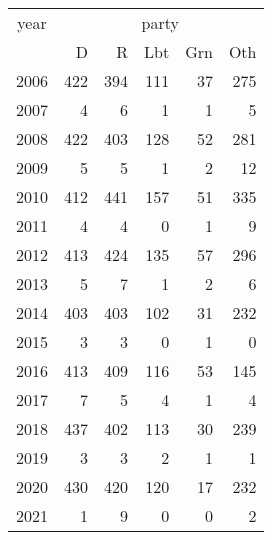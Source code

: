 \footnotesize\begin{tabular}[t]{lrrrrr}
\toprule
\multicolumn{1}{c}{year} & \multicolumn{5}{c}{party} \\
\cmidrule(l{3pt}r{3pt}){1-1} \cmidrule(l{3pt}r{3pt}){2-6}
  & D & R & Lbt & Grn & Oth\\
\midrule
2006 & 422 & 394 & 111 & 37 & 275\\
2007 & 4 & 6 & 1 & 1 & 5\\
2008 & 422 & 403 & 128 & 52 & 281\\
2009 & 5 & 5 & 1 & 2 & 12\\
2010 & 412 & 441 & 157 & 51 & 335\\
2011 & 4 & 4 & 0 & 1 & 9\\
2012 & 413 & 424 & 135 & 57 & 296\\
2013 & 5 & 7 & 1 & 2 & 6\\
2014 & 403 & 403 & 102 & 31 & 232\\
2015 & 3 & 3 & 0 & 1 & 0\\
2016 & 413 & 409 & 116 & 53 & 145\\
2017 & 7 & 5 & 4 & 1 & 4\\
2018 & 437 & 402 & 113 & 30 & 239\\
2019 & 3 & 3 & 2 & 1 & 1\\
2020 & 430 & 420 & 120 & 17 & 232\\
2021 & 1 & 9 & 0 & 0 & 2\\
\bottomrule
\end{tabular}

